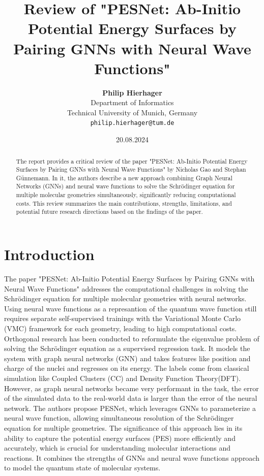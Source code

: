 \documentclass{article}
\title{Review of "PESNet: Ab-Initio Potential Energy Surfaces by Pairing GNNs with Neural Wave Functions"}
\author{\textbf{Philip Hierhager}\\Department of Informatics\\Technical University of Munich, Germany\\
\texttt{philip.hierhager@tum.de}
}
\date{20.08.2024}
\begin{document}
\maketitle

\begin{abstract}
    The report provides a critical review of the paper "PESNet: Ab-Initio Potential Energy Surfaces by Pairing GNNs with Neural Wave Functions" by Nicholas Gao and Stephan Günnemann. In it, the authors describe a new approach combining Graph Neural Networks (GNNs) and neural wave functions to solve the Schrödinger equation for multiple molecular geometries simultaneously, significantly reducing computational costs. This review summarizes the main contributions, strengths, limitations, and potential future research directions based on the findings of the paper.
\end{abstract}

\section{Introduction}
The paper "PESNet: Ab-Initio Potential Energy Surfaces by Pairing GNNs with Neural Wave Functions" addresses the computational challenges in solving the Schrödinger equation for multiple molecular geometries with neural networks. Using neural wave functions as a represantion of the quantum wave function still requires separate self-supervised trainings with the Variational Monte Carlo (VMC) framework for each geometry, leading to high computational costs. Orthogonal research has been conducted to reformulate the eigenvalue problem of solving the Schrödinger equation as a supervised regression task. It models the system with graph neural networks (GNN) and takes features like position and charge of the nuclei and regresses on its energy. The labels come from classical simulation like Coupled Clusters (CC) and Density Function Theory(DFT). However, as graph neural networks became very performant in the task, the error of the simulated data to the real-world data is larger than the error of the neural network. The authors propose PESNet, which leverages GNNs to parameterize a neural wave function, allowing simultaneous resolution of the Schrödinger equation for multiple geometries. The significance of this approach lies in its ability to capture the potential energy surfaces (PES) more efficiently and accurately, which is crucial for understanding molecular interactions and reactions. It combines the strengths of GNNs and neural wave functions approach to model the quantum state of molecular systems.
\end{document}
